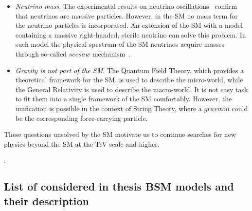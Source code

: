 \begin{itemize}
\item \textit{Neutrino mass.} The experimental results on neutrino oscillations~\cite{Fukuda:1998fd} confirm that neutrinos are massive particles. However, in the SM no mass term for the neutrino particles is incorporated. An extension of the SM with a model containing a massive right-handed, sterile neutrino can solve this problem. In such model the physical spectrum of the SM neutrinos acquire masses through so-called $seesaw$ mechanism~\cite{Mohapatra:1979ia}.
\item \textit{Gravity is not part of the SM.} The Quantum Field Theory, which provides a theoretical framework for the SM, is used to describe the micro-world, while the General Relativity is used to describe the macro-world. It is not easy task to fit them into a single framework of the SM comfortably. However, the unification is possible in the context of String Theory, where a $graviton$ could be the corresponding force-carrying particle.
\end{itemize}

These questions unsolved by the SM motivate us to continue searches for new physics beyond the SM at the TeV scale and higher.




.


\subsection{List of considered in thesis BSM models and their description}

